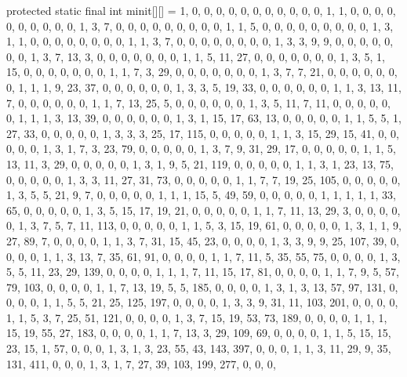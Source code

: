 \begin{code}
\begin{hide}
   protected static final int minit[][] = {
     {1, 0, 0, 0, 0, 0, 0, 0, 0, 0, 0, 0},
     {1, 1, 0, 0, 0, 0, 0, 0, 0, 0, 0, 0},
     {1, 3, 7, 0, 0, 0, 0, 0, 0, 0, 0, 0},
     {1, 1, 5, 0, 0, 0, 0, 0, 0, 0, 0, 0},
     {1, 3, 1, 1, 0, 0, 0, 0, 0, 0, 0, 0},
     {1, 1, 3, 7, 0, 0, 0, 0, 0, 0, 0, 0},
     {1, 3, 3, 9, 9, 0, 0, 0, 0, 0, 0, 0},
     {1, 3, 7, 13, 3, 0, 0, 0, 0, 0, 0, 0},
     {1, 1, 5, 11, 27, 0, 0, 0, 0, 0, 0, 0},
     {1, 3, 5, 1, 15, 0, 0, 0, 0, 0, 0, 0},
     {1, 1, 7, 3, 29, 0, 0, 0, 0, 0, 0, 0},
     {1, 3, 7, 7, 21, 0, 0, 0, 0, 0, 0, 0},
     {1, 1, 1, 9, 23, 37, 0, 0, 0, 0, 0, 0},
     {1, 3, 3, 5, 19, 33, 0, 0, 0, 0, 0, 0},
     {1, 1, 3, 13, 11, 7, 0, 0, 0, 0, 0, 0},
     {1, 1, 7, 13, 25, 5, 0, 0, 0, 0, 0, 0},
     {1, 3, 5, 11, 7, 11, 0, 0, 0, 0, 0, 0},
     {1, 1, 1, 3, 13, 39, 0, 0, 0, 0, 0, 0},
     {1, 3, 1, 15, 17, 63, 13, 0, 0, 0, 0, 0},
     {1, 1, 5, 5, 1, 27, 33, 0, 0, 0, 0, 0},
     {1, 3, 3, 3, 25, 17, 115, 0, 0, 0, 0, 0},
     {1, 1, 3, 15, 29, 15, 41, 0, 0, 0, 0, 0},
     {1, 3, 1, 7, 3, 23, 79, 0, 0, 0, 0, 0},
     {1, 3, 7, 9, 31, 29, 17, 0, 0, 0, 0, 0},
     {1, 1, 5, 13, 11, 3, 29, 0, 0, 0, 0, 0},
     {1, 3, 1, 9, 5, 21, 119, 0, 0, 0, 0, 0},
     {1, 1, 3, 1, 23, 13, 75, 0, 0, 0, 0, 0},
     {1, 3, 3, 11, 27, 31, 73, 0, 0, 0, 0, 0},
     {1, 1, 7, 7, 19, 25, 105, 0, 0, 0, 0, 0},
     {1, 3, 5, 5, 21, 9, 7, 0, 0, 0, 0, 0},
     {1, 1, 1, 15, 5, 49, 59, 0, 0, 0, 0, 0},
     {1, 1, 1, 1, 1, 33, 65, 0, 0, 0, 0, 0},
     {1, 3, 5, 15, 17, 19, 21, 0, 0, 0, 0, 0},
     {1, 1, 7, 11, 13, 29, 3, 0, 0, 0, 0, 0},
     {1, 3, 7, 5, 7, 11, 113, 0, 0, 0, 0, 0},
     {1, 1, 5, 3, 15, 19, 61, 0, 0, 0, 0, 0},
     {1, 3, 1, 1, 9, 27, 89, 7, 0, 0, 0, 0},
     {1, 1, 3, 7, 31, 15, 45, 23, 0, 0, 0, 0},
     {1, 3, 3, 9, 9, 25, 107, 39, 0, 0, 0, 0},
     {1, 1, 3, 13, 7, 35, 61, 91, 0, 0, 0, 0},
     {1, 1, 7, 11, 5, 35, 55, 75, 0, 0, 0, 0},
     {1, 3, 5, 5, 11, 23, 29, 139, 0, 0, 0, 0},
     {1, 1, 1, 7, 11, 15, 17, 81, 0, 0, 0, 0},
     {1, 1, 7, 9, 5, 57, 79, 103, 0, 0, 0, 0},
     {1, 1, 7, 13, 19, 5, 5, 185, 0, 0, 0, 0},
     {1, 3, 1, 3, 13, 57, 97, 131, 0, 0, 0, 0},
     {1, 1, 5, 5, 21, 25, 125, 197, 0, 0, 0, 0},
     {1, 3, 3, 9, 31, 11, 103, 201, 0, 0, 0, 0},
     {1, 1, 5, 3, 7, 25, 51, 121, 0, 0, 0, 0},
     {1, 3, 7, 15, 19, 53, 73, 189, 0, 0, 0, 0},
     {1, 1, 1, 15, 19, 55, 27, 183, 0, 0, 0, 0},
     {1, 1, 7, 13, 3, 29, 109, 69, 0, 0, 0, 0},
     {1, 1, 5, 15, 15, 23, 15, 1, 57, 0, 0, 0},
     {1, 3, 1, 3, 23, 55, 43, 143, 397, 0, 0, 0},
     {1, 1, 3, 11, 29, 9, 35, 131, 411, 0, 0, 0},
     {1, 3, 1, 7, 27, 39, 103, 199, 277, 0, 0, 0},
}
\end{hide}
\end{code}
